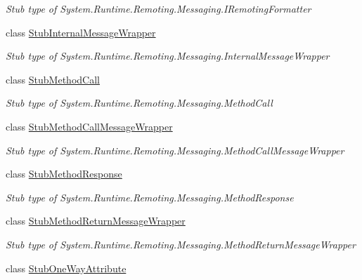 \begin{DoxyCompactItemize}
\begin{DoxyCompactList}\small\item\em Stub type of System.\-Runtime.\-Remoting.\-Messaging.\-I\-Remoting\-Formatter\end{DoxyCompactList}\item 
class \hyperlink{class_system_1_1_runtime_1_1_remoting_1_1_messaging_1_1_fakes_1_1_stub_internal_message_wrapper}{Stub\-Internal\-Message\-Wrapper}
\begin{DoxyCompactList}\small\item\em Stub type of System.\-Runtime.\-Remoting.\-Messaging.\-Internal\-Message\-Wrapper\end{DoxyCompactList}\item 
class \hyperlink{class_system_1_1_runtime_1_1_remoting_1_1_messaging_1_1_fakes_1_1_stub_method_call}{Stub\-Method\-Call}
\begin{DoxyCompactList}\small\item\em Stub type of System.\-Runtime.\-Remoting.\-Messaging.\-Method\-Call\end{DoxyCompactList}\item 
class \hyperlink{class_system_1_1_runtime_1_1_remoting_1_1_messaging_1_1_fakes_1_1_stub_method_call_message_wrapper}{Stub\-Method\-Call\-Message\-Wrapper}
\begin{DoxyCompactList}\small\item\em Stub type of System.\-Runtime.\-Remoting.\-Messaging.\-Method\-Call\-Message\-Wrapper\end{DoxyCompactList}\item 
class \hyperlink{class_system_1_1_runtime_1_1_remoting_1_1_messaging_1_1_fakes_1_1_stub_method_response}{Stub\-Method\-Response}
\begin{DoxyCompactList}\small\item\em Stub type of System.\-Runtime.\-Remoting.\-Messaging.\-Method\-Response\end{DoxyCompactList}\item 
class \hyperlink{class_system_1_1_runtime_1_1_remoting_1_1_messaging_1_1_fakes_1_1_stub_method_return_message_wrapper}{Stub\-Method\-Return\-Message\-Wrapper}
\begin{DoxyCompactList}\small\item\em Stub type of System.\-Runtime.\-Remoting.\-Messaging.\-Method\-Return\-Message\-Wrapper\end{DoxyCompactList}\item 
class \hyperlink{class_system_1_1_runtime_1_1_remoting_1_1_messaging_1_1_fakes_1_1_stub_one_way_attribute}{Stub\-One\-Way\-Attribute}

\end{DoxyCompactItemize}
